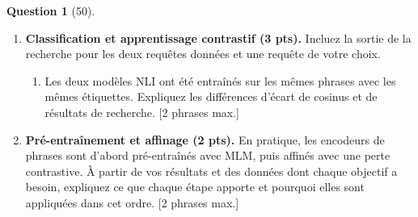 \documentclass[12pt]{article}
\theoremstyle{definition}
\newtheorem{exercise}{Question}%
\begin{document}
\begin{exercise}[50]
\begin{enumerate}
  \item \textbf{Classification et apprentissage contrastif (3 pts).} Incluez la sortie de la recherche pour les deux
  requêtes données et une requête de votre choix.
  \begin{enumerate}
    \item Les deux modèles NLI ont été entraînés sur les mêmes phrases avec les mêmes étiquettes. Expliquez les
          différences d'écart de cosinus et de résultats de recherche. [2 phrases max.]
  \end{enumerate}

  \item \textbf{Pré-entraînement et affinage (2 pts).} En pratique, les encodeurs de phrases sont d'abord
  pré-entraînés avec MLM, puis affinés avec une perte contrastive. À partir de vos résultats et des données dont
  chaque objectif a besoin, expliquez ce que chaque étape apporte et pourquoi elles sont appliquées dans cet ordre.
  [2 phrases max.]
\end{enumerate}

\end{exercise}
\end{document}
